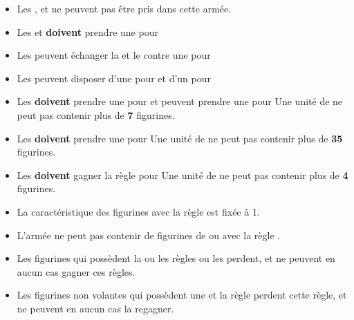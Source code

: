 \begin{multicols}{2}
\begin{itemize}[label={-}, leftmargin=*]
\item Les \greatvultures{}, \scarabswarms{} et \wingedreapers{} ne peuvent pas être pris dans cette armée.
\end{itemize}

\vspace*{\fill}\columnbreak

\begin{center}\armynewsubsection{\lordofthebarrowlegion}\end{center}

\begin{itemize}[label={-}, leftmargin=*]
\item Les \skeletons{} et \skeletonarchers{} \textbf{doivent} pren\-dre une \ha{} pour \permodel{}

\item Les \skeletons{} peuvent échanger la \spear{} et le \shield{} contre une \halberd{} pour \permodel{}

\item Les \skeletoncavalry{} peuvent disposer d'une \lance{} pour \permodel{} et d'un \barding{} pour \permodel{}

\item Les \skeletonchariots{} \textbf{doivent} prendre une \ha{} pour \permodel{} et peuvent prendre une \halberd{} pour \permodel{} Une unité de \skeletonchariots{} ne peut pas contenir plus de \textbf{7} figurines.

\item Les \necropolisguards{} \textbf{doivent} prendre une \ha{} pour \permodel{} Une unité de \necropolisguards{} ne peut pas contenir plus de \textbf{35} figurines.

\item Les \scarabswarms{} \textbf{doivent} gagner la règle \ethereal{} pour \permodel{} Une unité de \scarabswarms{} ne peut pas contenir plus de \textbf{4} figurines.

\item La caractéristique \risen{} des figurines avec la règle \ethereal{} est fixée à 1.

\item L'armée ne peut pas contenir de figurines de \monstrouscavalry{} ou avec la règle \largetarget{}.

\item Les figurines qui possèdent la ou les règles \undergroundambush{} ou \scout{} les perdent, et ne peuvent en aucun cas gagner ces règles.

\item Les figurines non volantes qui possèdent une \ha{} et la règle \lighttroops{} perdent cette règle, et ne peuvent en aucun cas la regagner.
\end{itemize}

\vspace*{\fill}\end{multicols}

